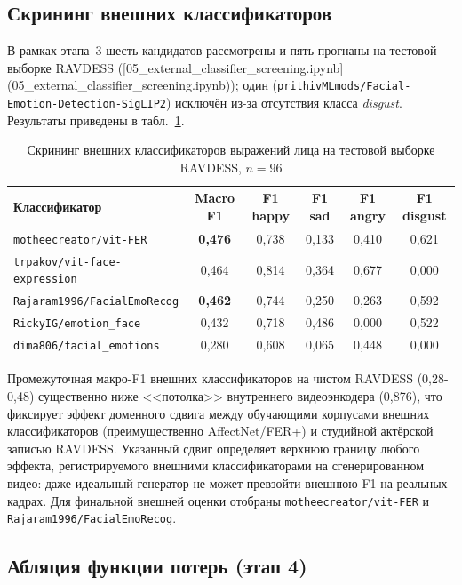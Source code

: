 \documentclass[a4paper, 12pt, oneside, openany]{article}
\begin{document}
\subsection{Скрининг внешних классификаторов}

В рамках этапа~3 шесть кандидатов рассмотрены и пять прогнаны на тестовой выборке RAVDESS ([05\_external\_classifier\_screening.ipynb](05\_external\_classifier\_screening.ipynb)); один (\texttt{prithivMLmods/Facial-Emotion-Detection-SigLIP2}) исключён из-за отсутствия класса \textit{disgust}. Результаты приведены в табл.~\ref{tab:ext_screen}.

\begin{table}[H]
\caption{Скрининг внешних классификаторов выражений лица на тестовой выборке RAVDESS, $n=96$}
\label{tab:ext_screen}
\centering
\small
\begin{tabular}{|p{6cm}|c|c|c|c|c|}
\hline
\textbf{Классификатор} & \textbf{Macro F1} & \textbf{F1 happy} & \textbf{F1 sad} & \textbf{F1 angry} & \textbf{F1 disgust} \\
\hline
\texttt{motheecreator/vit-FER} & \textbf{0,476} & 0,738 & 0,133 & 0,410 & 0,621 \\
\hline
\texttt{trpakov/vit-face-expression} & 0,464 & 0,814 & 0,364 & 0,677 & 0,000 \\
\hline
\texttt{Rajaram1996/FacialEmoRecog} & \textbf{0,462} & 0,744 & 0,250 & 0,263 & 0,592 \\
\hline
\texttt{RickyIG/emotion\_face} & 0,432 & 0,718 & 0,486 & 0,000 & 0,522 \\
\hline
\texttt{dima806/facial\_emotions} & 0,280 & 0,608 & 0,065 & 0,448 & 0,000 \\
\hline
\end{tabular}
\end{table}

Промежуточная макро-F1 внешних классификаторов на чистом RAVDESS (0,28-0,48) существенно ниже <<потолка>> внутреннего видеоэнкодера (0,876), что фиксирует эффект доменного сдвига между обучающими корпусами внешних классификаторов (преимущественно AffectNet/FER+) и студийной актёрской записью RAVDESS. Указанный сдвиг определяет верхнюю границу любого эффекта, регистрируемого внешними классификаторами на сгенерированном видео: даже идеальный генератор не может превзойти внешнюю F1 на реальных кадрах. Для финальной внешней оценки отобраны \texttt{motheecreator/vit-FER} и \texttt{Rajaram1996/FacialEmoRecog}.

\subsection{Абляция функции потерь (этап 4)}
\end{document}
